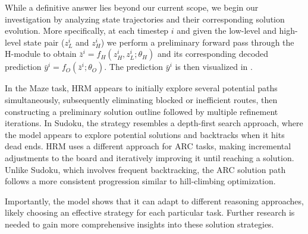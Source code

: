 While a definitive answer lies beyond our current scope, we begin our investigation by analyzing state trajectories and their corresponding solution evolution. More specifically, at each timestep $i$ and given the low-level and high-level state pair ($z_L^i$ and $z_H^i$) we perform a preliminary forward pass through the H-module to obtain $\bar{z}^{i} = f_H(z_H^i, z_L^i; \theta_H)$ and its corresponding decoded prediction $\bar{y}^{i} = f_O(\bar{z}^{i}; \theta_O)$. The prediction $\bar{y}^{i}$ is then visualized in .   

In the Maze task, HRM appears to initially explore several potential paths simultaneously, subsequently eliminating blocked or inefficient routes, then constructing a preliminary solution outline followed by multiple refinement iterations. In Sudoku, the strategy resembles a depth-first search approach, where the model appears to explore potential solutions and backtracks when it hits dead ends. HRM uses a different approach for ARC tasks, making incremental adjustments to the board and iteratively improving it until reaching a solution. Unlike Sudoku, which involves frequent backtracking, the ARC solution path follows a more consistent progression similar to hill-climbing optimization. 
 
Importantly, the model shows that it can adapt to different reasoning approaches, likely choosing an effective strategy for each particular task. Further research is needed to gain more comprehensive insights into these solution strategies.
